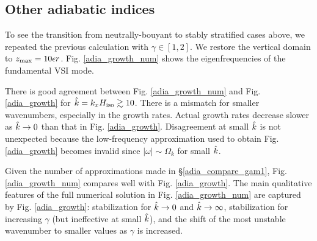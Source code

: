 \subsection{Other adiabatic indices}
To see the transition from neutrally-bouyant to stably stratified cases above, 
we repeated the previous calculation with $\gamma\in[1,2]$. 
We restore the vertical domain to $z_\mathrm{max}=10\epsilon r$. 
Fig. \ref{adia_growth_num} shows the eigenfrequencies of the
fundamental VSI mode. 


There is good agreement between Fig. \ref{adia_growth_num} and
Fig. \ref{adia_growth} for $\hat{k}=k_xH_\mathrm{iso}\gtrsim10$. There is a
mismatch for smaller wavenumbers, especially in the growth
rates. Actual growth rates decrease slower as $\hat{k}\to0$
than that in Fig. \ref{adia_growth}. Disagreement at small
$\hat{k}$ is not unexpected because the low-frequency
approximation used to obtain Fig. \ref{adia_growth} becomes invalid since
$|\omega|\sim\Omega_k$ for small $\hat{k}$.  

Given the number of approximations made in \S\ref{adia_compare_gam1},
Fig. \ref{adia_growth_num} compares well with 
Fig. \ref{adia_growth}. The main qualitative features of the full
numerical solution in Fig. \ref{adia_growth_num} are captured by
Fig. \ref{adia_growth}: stabilization for 
$\hat{k}\to0$ and $\hat{k}\to\infty$,
stabilization for increasing $\gamma$ (but ineffective at small $\hat{k}$), 
and the shift of the most unstable wavenumber to smaller values as
$\gamma$ is increased. 


